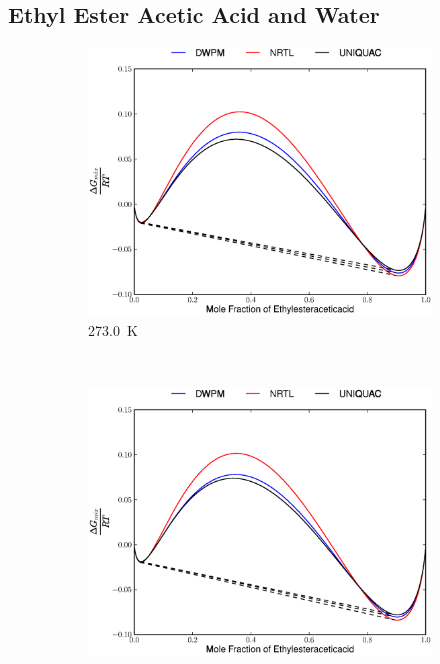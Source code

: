 \subsection{Ethyl Ester Acetic Acid and Water}
\vspace*{\fill}
\begin{figure}[hp]
\begin{subfigure}[h]{0.5\textwidth}
	\centering
	\includegraphics[width = \textwidth]{Results_Parts/BinaryParams/ethylesteraceticacid-water/AllModelsGibbsPlots/T_273.0.eps}
	\caption{273.0~$\mathrm{K}$} 
\end{subfigure}%
~%
\begin{subfigure}[h]{0.5\textwidth}
	\centering
	\includegraphics[width = \textwidth]{Results_Parts/BinaryParams/ethylesteraceticacid-water/AllModelsGibbsPlots/T_278.0.eps}

\end{subfigure}
\end{figure}
